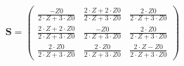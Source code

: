 \begin{equation} \mathbf{S} = \left(\begin{array}{ccc} \frac{-Z0}{2\cdot Z+3\cdot Z0} & \frac{2\cdot Z+2\cdot Z0}{2\cdot Z+3\cdot Z0} & \frac{2\cdot Z0}{2\cdot Z+3\cdot Z0} \\ \frac{2\cdot Z+2\cdot Z0}{2\cdot Z+3\cdot Z0} & \frac{-Z0}{2\cdot Z+3\cdot Z0} & \frac{2\cdot Z0}{2\cdot Z+3\cdot Z0} \\ \frac{2\cdot Z0}{2\cdot Z+3\cdot Z0} & \frac{2\cdot Z0}{2\cdot Z+3\cdot Z0} & \frac{2\cdot Z-Z0}{2\cdot Z+3\cdot Z0} \end{array}\right) \end{equation}
